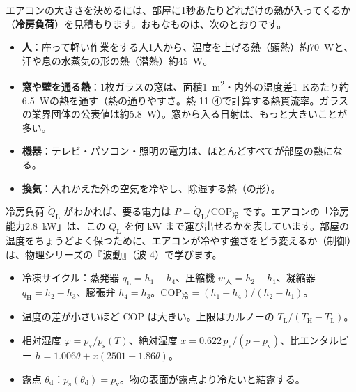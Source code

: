 
\leavevmode\label{ph:熱-9:sec9}エアコンの大きさを決めるには、部屋に1秒あたりどれだけの熱が入ってくるか（\textbf{冷房負荷}）を見積もります。おもなものは、次のとおりです。
\begin{itemize}[label={\color{bkTheme}●}, leftmargin=1.6\zw, itemsep=2pt, topsep=2pt]
\item \textbf{人}：座って軽い作業をする人1人から、温度を上げる熱（顕熱）約\qty{70}{W}と、汗や息の水蒸気の形の熱（潜熱）約\qty{45}{W}。
\item \textbf{窓や壁を通る熱}：1枚ガラスの窓は、面積\qty{1}{m^2}・内外の温度差\qty{1}{K}あたり約\qty{6.5}{W}の熱を通す（熱の通りやすさ。熱-11 ④で計算する熱貫流率。ガラスの業界団体の公表値は約\qty{5.8}{W}）。窓から入る日射は、もっと大きいことが多い。
\item \textbf{機器}：テレビ・パソコン・照明の電力は、ほとんどすべてが部屋の熱になる。
\item \textbf{換気}：入れかえた外の空気を冷やし、除湿する熱（の形）。
\end{itemize}
冷房負荷 $\dot Q_{\mathrm L}$ がわかれば、要る電力は $P=\dot Q_{\mathrm L}/\mathrm{COP}_{\text{冷}}$ です。エアコンの「冷房能力\qty{2.8}{kW}」は、この $\dot Q_{\mathrm L}$ を何 kW まで運び出せるかを表しています。部屋の温度をちょうどよく保つために、エアコンが冷やす強さをどう変えるか（制御）は、物理シリーズの『波動』（波-4）で学びます。

\begin{taisetsu}
\begin{itemize}[leftmargin=1.2\zw, itemsep=2pt, topsep=0pt, label={\color{bkNavy}●}]
\item 冷凍サイクル：蒸発器 $q_{\mathrm L}=h_1-h_4$、圧縮機 $w_{\text{入}}=h_2-h_1$、凝縮器 $q_{\mathrm H}=h_2-h_3$、膨張弁 $h_4=h_3$。$\mathrm{COP}_{\text{冷}}=(h_1-h_4)/(h_2-h_1)$。
\item 温度の差が小さいほど COP は大きい。上限はカルノーの $T_{\mathrm L}/(T_{\mathrm H}-T_{\mathrm L})$。
\item 相対湿度 $\varphi=p_{\mathrm v}/p_{\mathrm s}(T)$、絶対湿度 $x=0.622\,p_{\mathrm v}/(p-p_{\mathrm v})$、比エンタルピー $h=1.006\theta+x(2501+1.86\theta)$。
\item 露点 $\theta_{\mathrm d}$：$p_{\mathrm s}(\theta_{\mathrm d})=p_{\mathrm v}$。物の表面が露点より冷たいと結露する。
\end{itemize}
\end{taisetsu}

